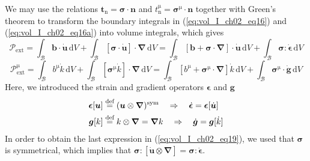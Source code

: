 We may use the relations ${\bm t}_{\mathrm{n}}={\bm\sigma} \cdot{\bm n}$ and $t_{\mathrm{n}}^{\mathrm{\mu}}=\bm{\sigma}^{\mathrm{\mu}}\cdot{\bm n}$
together with Green's theorem to transform the boundary integrals in
(\ref{eq:vol_I_ch02_eq16}) and (\ref{eq:vol_I_ch02_eq16a}) into volume integrals, which gives
\begin{equation}
  {\mathcal{P}}_{\mathrm{ext}} = \int_{\mathcal B}{\bm b}\cdot{\dot{\bm u}} \,{\mathrm{d}}V +
  \int_{\mathcal B} [{\bm \sigma}\cdot{\dot{\bm u}}] \cdot \bm{\nabla} \,{\mathrm{d}}V =
  \int_{\mathcal B}[\bm b + \bm{\sigma} \cdot \bm{\nabla}]\cdot\dot{\bm u}\,{\mathrm{d}}V +
  \int_{\mathcal B} {\bm \sigma} : \dot{\bm \epsilon}\, {\mathrm{d}}V
\label{eq:vol_I_ch02_eq19}
\end{equation}
\begin{equation}
  {\mathcal{P}}_{\mathrm{ext}}^{\mathrm{\mu}} = \int_{\mathcal B} b^{\mathrm{\mu}}\dot{k} \,{\mathrm{d}}V +
  \int_{\mathcal B} [{\bm \sigma}^{\mathrm{\mu}}\dot{k}] \cdot \bm{\nabla} \,{\mathrm{d}}V =
  \int_{\mathcal B}[b^{\mathrm{\mu}} + \bm{\sigma}^{\mathrm{\mu}} \cdot \bm{\nabla}]\dot{k}\,{\mathrm{d}}V +
  \int_{\mathcal B} \bm{\sigma}^{\mathrm{\mu}} \cdot \dot{\bm g}\, {\mathrm{d}}V
  \label{eq:vol_I_ch02_eq19a}
\end{equation}
Here, we introduced the strain and gradient operators $\bm{\epsilon}$ and $\bm{g}$
\begin{subequations}\label{eq:vol_I_ch02_eq119}
\begin{align}
    \bm{\epsilon}[\bm{u}] &\stackrel{\text{def}}{=} (\bm{u}\otimes\bm{\nabla})^{\mathrm{sym}} \quad \Rightarrow \quad \dot{\bm{\epsilon}}=\bm{\epsilon}[\dot{\bm{u}}]
\label{eq:vol_I_ch02_eq119a} \\
    \bm{g}[k] &\stackrel{\text{def}}{=} k\otimes\bm{\nabla} = \bm{\nabla} k \quad \Rightarrow \quad \dot{\bm{g}}=\bm{g}[\dot{k}]
\label{eq:vol_I_ch02_eq119b}
\end{align}
\end{subequations}
In order to obtain the last expression in (\ref{eq:vol_I_ch02_eq19}), we used that ${\bm \sigma}$ is
symmetrical, which implies that ${\bm \sigma}: \left[ \bm{\dot{u}}
\otimes \bm \nabla \right] ={\bm \sigma}:\dot{\bm \epsilon}$.

